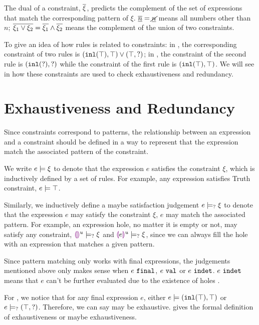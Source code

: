 \documentclass[acmsmall,screen,review,nonacm]{acmart}
\theoremstyle{slplain}
\numberwithin{thm}{section}
\begin{document}
The dual of a constraint, $\overline{\xi}$, predicts the complement of the set of expressions that match the corresponding pattern of $\xi$.
\eg $\overline{\underline{n}}=\underline{\cancel{n}}$ means all numbers other than $n$;
$\overline{\xi_1 \vee \xi_2}=\overline{\xi_1} \wedge \overline{\xi_2}$ means the complement of the union of two constraints.

To give an idea of how rules is related to constraints:
in , the corresponding constraint of two rules is $(\mathtt{inl}(\top) , \top) \vee (\top , \mathtt{?})$;
in , the constraint of the second rule is $(\mathtt{inl}(\mathtt{?}) , \mathtt{?})$ while the constraint of the first rule is $(\mathtt{inl}(\top) , \top)$.
We will see in  how these constraints are used to check exhaustiveness and redundancy.

\section{Exhaustiveness and Redundancy}
\label{sec:exhaustiveness-redundancy}

Since constraints correspond to patterns, the relationship between an expression and a constraint should be defined in a way to represent that the expression match the associated pattern of the constraint.

We write $e \models \xi$ to denote that the expression $e$ satisfies the constraint $\xi$, which is inductively defined by a set of rules. For example, any expression satisfies Truth constraint, $e \models \top$.

Similarly, we inductively define a maybe satisfaction judgement $e \models_{?} \xi$ to denote that the expression $e$ may satisfy the constraint $\xi$, \ie $e$ may match the associated pattern. For example, an expression hole, no matter it is empty or not, may satisfy any constraint, \ie $\textcolor{violet}{\llparenthesis}\textcolor{violet}{\rrparenthesis}^{u} \models_{?} \xi$ and $\textcolor{violet}{\llparenthesis} e\textcolor{violet}{\rrparenthesis}^{u} \models_{?} \xi$, since we can always fill the hole with an expression that matches a given pattern.

Since pattern matching only works with final expressions, the judgements mentioned above only makes sense when $e ~\mathtt{final}$, \ie $e ~\mathtt{val}$ or $e ~\mathtt{indet}$. $e ~\mathtt{indet}$ means that $e$ can't be further evaluated due to the existence of holes \cite{DBLP:journals/pacmpl/OmarVCH19}.

For , we notice that for any final expression $e$, either 
$e \models (\mathtt{inl}(\top) , \top)$ or $e \models_{?} (\top , \mathtt{?})$.
Therefore, we can say  may be exhaustive.  gives the formal definition of exhaustiveness or maybe exhaustiveness.
\end{document}
